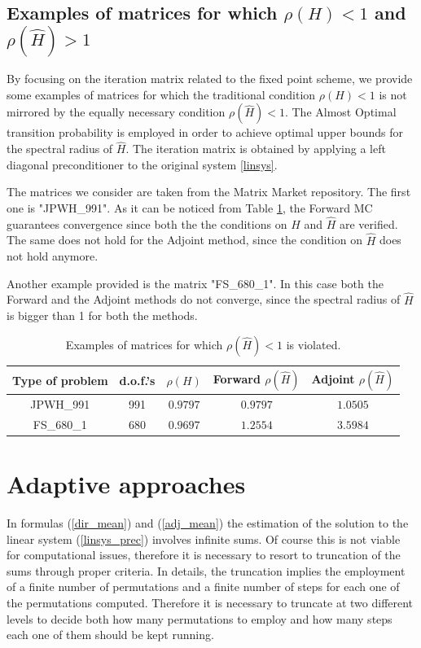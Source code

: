 \documentclass[a4paper,10pt]{article}
\begin{document}
\subsection*{Examples of matrices for which $\rho(H)<1$ and $\rho(\hat{H})>1$}
By focusing on the iteration matrix related to the fixed point scheme, we 
provide some examples of matrices for which the traditional condition 
$\rho(H)<1$ is not mirrored by the equally necessary condition 
$\rho(\hat{H})<1$.
The Almost Optimal transition probability is employed in order to achieve 
optimal upper bounds for the spectral radius of $\hat{H}$. The iteration matrix 
is 
obtained by applying a left diagonal preconditioner to the original system 
\ref{linsys}.


The matrices we consider are taken from the Matrix Market repository. The first 
one is "JPWH\_991". As it can be noticed from Table \ref{table_nonconv}, the 
Forward MC guarantees convergence since both the the conditions on $H$ and 
$\hat{H}$ 
are verified. The same does not hold for the Adjoint method, since the condition 
on $\hat{H}$ does not hold anymore. 

Another example provided is the matrix "FS\_680\_1". In this case both the 
Forward and the Adjoint methods do not converge, since the spectral radius of 
$\hat{H}$ is bigger than 1 for both the methods. 


\begin{table}[!h]
\centering
\begin{tabular}{|c|c|c|c|c|}
\hline
\textbf{Type of problem} & \textbf{d.o.f.'s} &
$\rho(H)$&Forward $\rho(\hat{H})$&Adjoint $\rho(\hat{H})$\\
\hline
JPWH\_991 & 991 & $0.9797$ & $0.9797$ & $1.0505$\\ 
\hline
FS\_680\_1 & 680 & $0.9697$ & $1.2554$ & $3.5984$\\
\hline
\end{tabular}
\caption{Examples of matrices for which $\rho(\hat{H})<1$ is violated.} 
\label{table_nonconv}
\end{table}




\section{Adaptive approaches}

In formulas (\ref{dir_mean}) and (\ref{adj_mean}) the estimation of the 
solution to
the linear system (\ref{linsys_prec}) involves infinite sums. Of course this is 
not viable for 
computational issues, therefore it is necessary to resort to truncation of 
the sums through proper criteria. In details, the truncation implies the 
employment of a finite number of permutations and a finite number of 
steps for each one of the permutations computed. Therefore it is necessary to 
truncate at two different levels to decide both how many permutations to employ 
and how many steps each one of them should be kept running.
\end{document}
